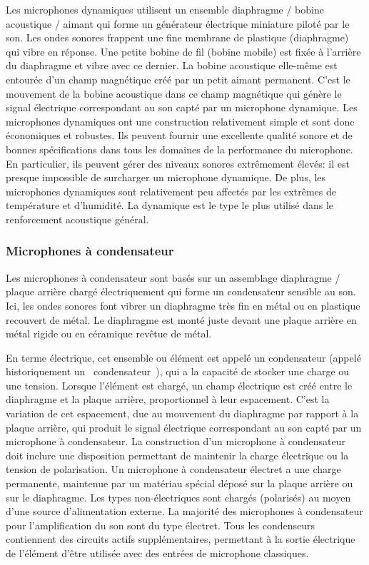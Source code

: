 \documentclass[a4paper, 12pt]{book}
\begin{document}
Les microphones dynamiques utilisent un ensemble diaphragme / bobine acoustique / aimant qui forme un générateur électrique miniature piloté par le son. Les ondes sonores frappent une fine membrane de plastique (diaphragme) qui vibre en réponse. Une petite bobine de fil (bobine mobile) est fixée à l'arrière du diaphragme et vibre avec ce dernier. La bobine acoustique elle-même est entourée d'un champ magnétique créé par un petit aimant permanent. C'est le mouvement de la bobine acoustique dans ce champ magnétique qui génère le signal électrique correspondant au son capté par un microphone dynamique. Les microphones dynamiques ont une construction relativement simple et sont donc économiques et robustes. Ils peuvent fournir une excellente qualité sonore et de bonnes spécifications dans tous les domaines de la performance du microphone. En particulier, ils peuvent gérer des niveaux sonores extrêmement élevés: il est presque impossible de surcharger un microphone dynamique. De plus, les microphones dynamiques sont relativement peu affectés par les extrêmes de température et d'humidité. La dynamique est le type le plus utilisé dans le renforcement acoustique général.


\subsubsection{Microphones à condensateur}

Les microphones à condensateur sont basés sur un assemblage diaphragme / plaque arrière chargé électriquement qui forme un condensateur sensible au son. Ici, les ondes sonores font vibrer un diaphragme très fin en métal ou en plastique recouvert de métal. Le diaphragme est monté juste devant une plaque arrière en métal rigide ou en céramique revêtue de métal. 

En terme électrique, cet ensemble ou élément est appelé un condensateur (appelé historiquement un \guillemotleft{}~condensateur~\guillemotright{}), qui a la capacité de stocker une charge ou une tension. Lorsque l'élément est chargé, un champ électrique est créé entre le diaphragme et la plaque arrière, proportionnel à leur espacement. C'est la variation de cet espacement, due au mouvement du diaphragme par rapport à la plaque arrière, qui produit le signal électrique correspondant au son capté par un microphone à condensateur. La construction d'un microphone à condensateur doit inclure une disposition permettant de maintenir la charge électrique ou la tension de polarisation. Un microphone à condensateur électret a une charge permanente, maintenue par un matériau spécial déposé sur la plaque arrière ou sur le diaphragme. Les types non-électriques sont chargés (polarisés) au moyen d'une source d'alimentation externe. La majorité des microphones à condensateur pour l'amplification du son sont du type électret. Tous les condenseurs contiennent des circuits actifs supplémentaires, permettant à la sortie électrique de l'élément d'être utilisée avec des entrées de microphone classiques. 
\end{document}
